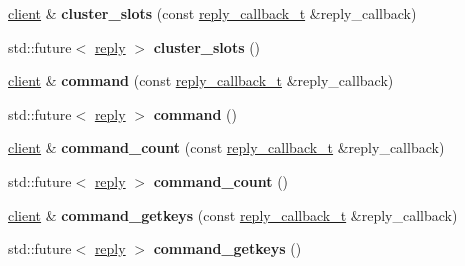 \begin{DoxyCompactItemize}
\mbox{\hyperlink{classcpp__redis_1_1client}{client}} \& {\bfseries cluster\+\_\+slots} (const \mbox{\hyperlink{classcpp__redis_1_1client_af7a65eb21aa25230bfbb0b0203c4fc04}{reply\+\_\+callback\+\_\+t}} \&reply\+\_\+callback)
\item 
\mbox{\label{classcpp__redis_1_1client_a9dc222141ab85da05efbce7a7ff0a7d1}} 
std\+::future$<$ \mbox{\hyperlink{classcpp__redis_1_1reply}{reply}} $>$ {\bfseries cluster\+\_\+slots} ()
\item 
\mbox{\label{classcpp__redis_1_1client_accac4fab4be3f71b94fc0aa02496f6a3}} 
\mbox{\hyperlink{classcpp__redis_1_1client}{client}} \& {\bfseries command} (const \mbox{\hyperlink{classcpp__redis_1_1client_af7a65eb21aa25230bfbb0b0203c4fc04}{reply\+\_\+callback\+\_\+t}} \&reply\+\_\+callback)
\item 
\mbox{\label{classcpp__redis_1_1client_a93ef2e84647990d02aa67a1e22341b38}} 
std\+::future$<$ \mbox{\hyperlink{classcpp__redis_1_1reply}{reply}} $>$ {\bfseries command} ()
\item 
\mbox{\label{classcpp__redis_1_1client_a639c7fd5c7899ba474e65513ee337bea}} 
\mbox{\hyperlink{classcpp__redis_1_1client}{client}} \& {\bfseries command\+\_\+count} (const \mbox{\hyperlink{classcpp__redis_1_1client_af7a65eb21aa25230bfbb0b0203c4fc04}{reply\+\_\+callback\+\_\+t}} \&reply\+\_\+callback)
\item 
\mbox{\label{classcpp__redis_1_1client_af0cac37a62edbd7d699b379551f1ef9a}} 
std\+::future$<$ \mbox{\hyperlink{classcpp__redis_1_1reply}{reply}} $>$ {\bfseries command\+\_\+count} ()
\item 
\mbox{\label{classcpp__redis_1_1client_a3d23ff98ee82a404373d75b660720926}} 
\mbox{\hyperlink{classcpp__redis_1_1client}{client}} \& {\bfseries command\+\_\+getkeys} (const \mbox{\hyperlink{classcpp__redis_1_1client_af7a65eb21aa25230bfbb0b0203c4fc04}{reply\+\_\+callback\+\_\+t}} \&reply\+\_\+callback)
\item 
\mbox{\label{classcpp__redis_1_1client_a18ab313316e99ab0a690540f40de80e3}} 
std\+::future$<$ \mbox{\hyperlink{classcpp__redis_1_1reply}{reply}} $>$ {\bfseries command\+\_\+getkeys} ()

\end{DoxyCompactItemize}
